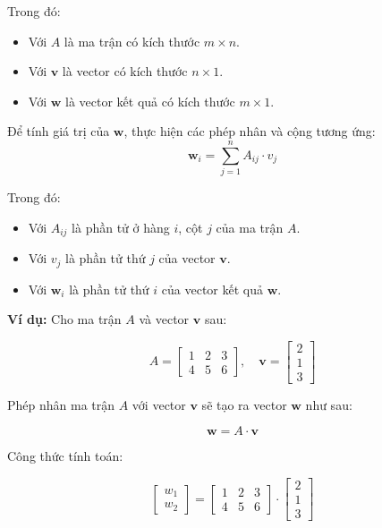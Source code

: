Trong đó:
\begin{itemize}
 \item Với \( A \) là ma trận có kích thước \( m \times n \).
 \item Với \( \mathbf{v} \) là vector có kích thước \( n \times 1 \).
 \item Với \( \mathbf{w} \) là vector kết quả có kích thước \( m \times 1 \).
\end{itemize}

Để tính giá trị của \( \mathbf{w} \), thực hiện các phép nhân và cộng tương ứng:
\[ \mathbf{w}_i = \sum_{j=1}^{n} A_{ij} \cdot v_j \]

Trong đó:
\begin{itemize}
 \item Với \( A_{ij} \) là phần tử ở hàng \( i \), cột \( j \) của ma trận \( A \).
 \item Với \( v_j \) là phần tử thứ \( j \) của vector \( \mathbf{v} \).
 \item Với \( \mathbf{w}_i \) là phần tử thứ \( i \) của vector kết quả \( \mathbf{w} \).
\end{itemize}

\textbf{Ví dụ:}
Cho ma trận \( A \) và vector \( \mathbf{v} \) sau:

\[ A = \begin{bmatrix} 1 & 2 & 3 \\ 4 & 5 & 6 \end{bmatrix}, \quad \mathbf{v} = \begin{bmatrix} 2 \\ 1 \\ 3 \end{bmatrix} \]

Phép nhân ma trận \( A \) với vector \( \mathbf{v} \) sẽ tạo ra vector \( \mathbf{w} \) như sau:

\[ \mathbf{w} = A \cdot \mathbf{v} \]

Công thức tính toán:

\[ \begin{bmatrix} w_1 \\ w_2 \end{bmatrix} = \begin{bmatrix} 1 & 2 & 3 \\ 4 & 5 & 6 \end{bmatrix} \cdot \begin{bmatrix} 2 \\ 1 \\ 3 \end{bmatrix} \]

